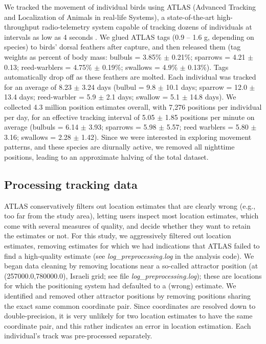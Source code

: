 \begin{refsection}
We tracked the movement of individual birds using ATLAS (Advanced Tracking and Localization of Animals in real-life Systems), a state-of-the-art high-throughput radio-telemetry system capable of tracking dozens of individuals at intervals as low as 4 seconds \citep{weiser2016,toledo2014,toledo2020,nathan2022}.
We glued ATLAS tags (0.9 -- 1.6 g, depending on species) to birds' dorsal feathers after capture, and then released them (tag weights as percent of body mass: bulbuls = 3.85\% $\pm$ 0.21\%; sparrows = 4.21 $\pm$ 0.13; reed-warblers = 4.75\% $\pm$ 0.19\%; swallows = 4.9\% $\pm$ 0.13\%).
Tags automatically drop off as these feathers are molted.
Each individual was tracked for an average of 8.23 $\pm$ 3.24 days (bulbul = 9.8 $\pm$ 10.1 days; sparrow = 12.0 $\pm$ 13.4 days; reed-warbler = 5.9 $\pm$ 2.1 days; swallow = 5.1 $\pm$ 14.8 days).
We collected 4.3 million position estimates overall, with 7,276 positions per individual per day, for an effective tracking interval of 5.05 $\pm$ 1.85 positions per minute on average (bulbuls = 6.14 $\pm$ 3.93; sparrows = 5.98 $\pm$ 5.57; reed warblers = 5.80 $\pm$ 3.16; swallows = 2.28 $\pm$ 1.42).
Since we were interested in exploring movement patterns, and these species are diurnally active, we removed all nighttime positions, leading to an approximate halving of the total dataset.

\subsection{Processing tracking data}

ATLAS conservatively filters out location estimates that are clearly wrong (e.g., too far from the study area), letting users inspect most location estimates, which come with several measures of quality, 
and decide whether they want to retain the estimates or not. 
For this study, we aggressively filtered out location estimates, removing estimates for which we had indications that ATLAS failed to find a high-quality estimate \citep{gupte2022d} (see \emph{log\_preprocessing.log} in the analysis code).
We began data cleaning by removing locations near a so-called attractor position (at (257000.0,780000.0), Israeli grid; see file \textit{log\_preprocessing.log}); these are locations for which the positioning system had defaulted to a (wrong) estimate.
We identified and removed other attractor positions by removing positions sharing the exact same common coordinate pair. 
Since coordinates are resolved down to double-precision, it is very unlikely for two location estimates to have the same coordinate pair, and this rather indicates an error in location estimation.
Each individual's track was pre-processed separately.


\end{refsection}
